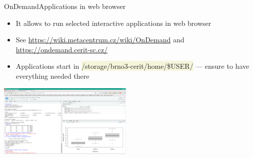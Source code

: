 \documentclass[compress, ucs, xelatex, 11pt, xcolor=svgnames, aspectratio=169,
	hyperref={
		bookmarks=true,
		unicode=true,
		colorlinks=true,
		pdftitle={Linux, command line and MetaCentrum},
		plainpages=false,
		pdfauthor={Vojtech Zeisek},
		pdfsubject={Course about use of Linux command line, writing shell scripts and using MetaCentrum of CESNET},
		pdfcreator={XeLaTeX},
		pdfkeywords={Linux, GNU, BASH, shell, command line, MetaCentrum},
		linkcolor=DarkRed, %
		anchorcolor=DarkBlue, %
		citecolor=Indigo, %
		filecolor=NavyBlue, %
		menucolor=DarkMagenta, %
		urlcolor=DarkBlue, %
		pdftex},
	url={hyphens, lowtilde} %
	]{beamer}
\renewcommand{\texttt}[1]{\colorbox{Beige}{{\ttfamily #1}}}
\begin{document}
\begin{frame}{OnDemand}{Applications in web browser}
	\begin{itemize}
		\item It allows to run selected interactive applications in web browser
		\item See \url{https://wiki.metacentrum.cz/wiki/OnDemand} and \url{https://ondemand.cerit-sc.cz/}
		\item Applications start in \texttt{/storage/brno3-cerit/home/\$USER/} --- ensure to have everything needed there
	\end{itemize}
	\begin{center}
		\includegraphics[height=3.5cm]{rstudio_ondemand.png}
	\end{center}
\end{frame}
\end{document}
